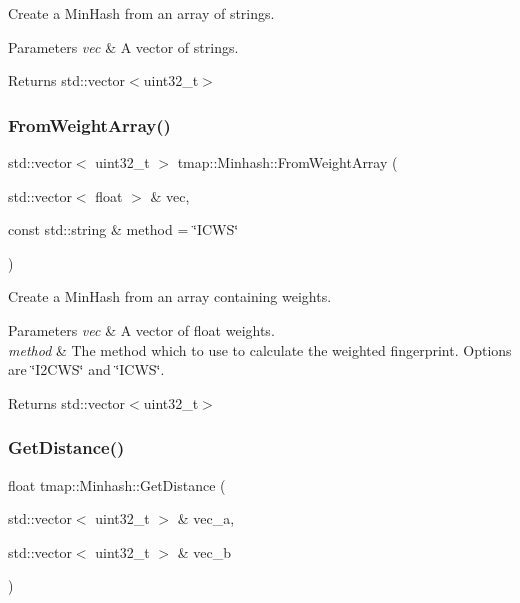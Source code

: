 Create a Min\+Hash from an array of strings. 


\begin{DoxyParams}{Parameters}
{\em vec} & A vector of strings. \\
\hline
\end{DoxyParams}
\begin{DoxyReturn}{Returns}
std\+::vector$<$uint32\+\_\+t$>$ 
\end{DoxyReturn}
\mbox{\label{classtmap_1_1Minhash_aac0a45bdf6a6517e711a171357c8c73b}} 
\subsubsection{\texorpdfstring{From\+Weight\+Array()}{FromWeightArray()}}
{\footnotesize\ttfamily std\+::vector$<$ uint32\+\_\+t $>$ tmap\+::\+Minhash\+::\+From\+Weight\+Array (\begin{DoxyParamCaption}\item[{std\+::vector$<$ float $>$ \&}]{vec,  }\item[{const std\+::string \&}]{method = {\ttfamily \char`\"{}ICWS\char`\"{}} }\end{DoxyParamCaption})}



Create a Min\+Hash from an array containing weights. 


\begin{DoxyParams}{Parameters}
{\em vec} & A vector of float weights. \\
\hline
{\em method} & The method which to use to calculate the weighted fingerprint. Options are \char`\"{}\+I2\+C\+W\+S\char`\"{} and \char`\"{}\+I\+C\+W\+S\char`\"{}. \\
\hline
\end{DoxyParams}
\begin{DoxyReturn}{Returns}
std\+::vector$<$uint32\+\_\+t$>$ 
\end{DoxyReturn}
\mbox{\label{classtmap_1_1Minhash_a21df254dd86462a1dcbe45285c747e71}} 
\subsubsection{\texorpdfstring{Get\+Distance()}{GetDistance()}}
{\footnotesize\ttfamily float tmap\+::\+Minhash\+::\+Get\+Distance (\begin{DoxyParamCaption}\item[{std\+::vector$<$ uint32\+\_\+t $>$ \&}]{vec\+\_\+a,  }\item[{std\+::vector$<$ uint32\+\_\+t $>$ \&}]{vec\+\_\+b }\end{DoxyParamCaption})}



